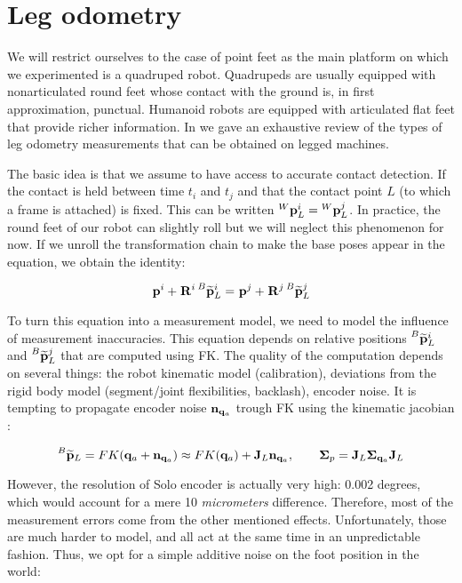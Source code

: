 \section{Leg odometry}
We will restrict ourselves to the case of point feet as the main platform on which we experimented is a quadruped robot.
Quadrupeds are usually equipped with nonarticulated round feet whose contact with the ground is, in first approximation, punctual.
Humanoid robots are equipped with articulated flat feet that provide richer information. In  we gave an exhaustive review of the types of leg 
odometry measurements that can be obtained on legged machines.

The basic idea is that we assume to have access to accurate contact detection. If the contact is held between time $t_i$ and $t_j$ and that
the contact point $L$ (to which a frame is attached) is fixed. This can be written $\prescript{W}{}{{\bf p}}_{L}^i = \prescript{W}{}{{\bf p}}_{L}^j$. 
In practice, the round feet of our robot can slightly roll but we will neglect this phenomenon for now. 
If we unroll the transformation chain to make the base poses appear in the equation, we obtain the identity:

\begin{equation}
    \prescript{}{}{{\bf p}}_{}^i + \prescript{}{}{{\bf R}}_{}^i \prescript{B}{}{\widetilde{{\bf p}}}_{L}^i = \prescript{}{}{{\bf p}}_{}^j + \prescript{}{}{{\bf R}}_{}^j \prescript{B}{}{\widetilde{{\bf p}}}_{L}^j
\end{equation}

To turn this equation into a measurement model, we need to model the influence of measurement inaccuracies.
This equation depends on relative positions $\prescript{B}{}{\widetilde{{\bf p}}}_{L}^i$ and $\prescript{B}{}{\widetilde{{\bf p}}}_{L}^j$ that are computed using FK. The quality of the computation depends on several things:
the robot kinematic model (calibration), deviations from the rigid body model (\eg segment/joint flexibilities, backlash), encoder noise.
It is tempting to propagate encoder noise ${\bf n}_{{\bf q}_a}$ trough FK using the kinematic jacobian \cite{bloesch2013state, hartley2018legged}:

\begin{equation}
    \prescript{B}{}{\widetilde{{\bf p}}}_{L} = FK({\bf q}_a + {\bf n}_{{\bf q}_a}) \approx FK({\bf q}_a) + {\bf J}_L{\bf n}_{{\bf q}_a}, \quad \quad {\bm \Sigma}_{p} = {\bf J}_L {\bm \Sigma}_{{\bf q}_a} {\bf J}_L
\end{equation}

However, the resolution of Solo encoder is actually very high: 0.002 degrees, which would account for a mere 10 \textit{micrometers} difference.
Therefore, most of the measurement errors come from the other mentioned effects. Unfortunately, those are much harder to model, and all act at the same time
in an unpredictable fashion. Thus, we opt for a simple additive noise on the foot position in the world:

